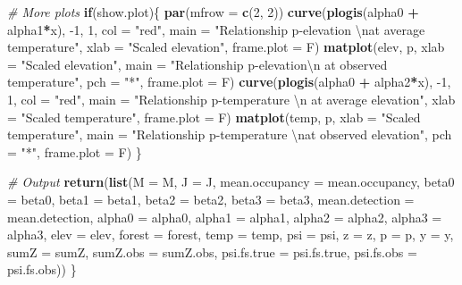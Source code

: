\documentclass[
]{book}
\newenvironment{Shaded}{\begin{snugshade}}{\end{snugshade}}
\newcommand{\CharTok}[1]{\textcolor[rgb]{0.31,0.60,0.02}{#1}}
\newcommand{\CommentTok}[1]{\textcolor[rgb]{0.56,0.35,0.01}{\textit{#1}}}
\newcommand{\ControlFlowTok}[1]{\textcolor[rgb]{0.13,0.29,0.53}{\textbf{#1}}}
\newcommand{\DataTypeTok}[1]{\textcolor[rgb]{0.13,0.29,0.53}{#1}}
\newcommand{\DecValTok}[1]{\textcolor[rgb]{0.00,0.00,0.81}{#1}}
\newcommand{\KeywordTok}[1]{\textcolor[rgb]{0.13,0.29,0.53}{\textbf{#1}}}
\newcommand{\NormalTok}[1]{#1}
\newcommand{\OperatorTok}[1]{\textcolor[rgb]{0.81,0.36,0.00}{\textbf{#1}}}
\newcommand{\StringTok}[1]{\textcolor[rgb]{0.31,0.60,0.02}{#1}}
\begin{document}
\begin{Shaded}
\begin{Highlighting}[]
\CommentTok{# More plots}
\ControlFlowTok{if}\NormalTok{(show.plot)\{}
  \KeywordTok{par}\NormalTok{(}\DataTypeTok{mfrow =} \KeywordTok{c}\NormalTok{(}\DecValTok{2}\NormalTok{, }\DecValTok{2}\NormalTok{))}
  \KeywordTok{curve}\NormalTok{(}\KeywordTok{plogis}\NormalTok{(alpha0 }\OperatorTok{+}\StringTok{ }\NormalTok{alpha1}\OperatorTok{*}\NormalTok{x), }\DecValTok{-1}\NormalTok{, }\DecValTok{1}\NormalTok{, }\DataTypeTok{col =} \StringTok{"red"}\NormalTok{, }
      \DataTypeTok{main =} \StringTok{"Relationship p-elevation }\CharTok{\textbackslash{}n}\StringTok{at average temperature"}\NormalTok{, }
      \DataTypeTok{xlab =} \StringTok{"Scaled elevation"}\NormalTok{, }\DataTypeTok{frame.plot =}\NormalTok{ F)}
  \KeywordTok{matplot}\NormalTok{(elev, p, }\DataTypeTok{xlab =} \StringTok{"Scaled elevation"}\NormalTok{, }
        \DataTypeTok{main =} \StringTok{"Relationship p-elevation}\CharTok{\textbackslash{}n}\StringTok{ at observed temperature"}\NormalTok{, }
        \DataTypeTok{pch =} \StringTok{"*"}\NormalTok{, }\DataTypeTok{frame.plot =}\NormalTok{ F)}
  \KeywordTok{curve}\NormalTok{(}\KeywordTok{plogis}\NormalTok{(alpha0 }\OperatorTok{+}\StringTok{ }\NormalTok{alpha2}\OperatorTok{*}\NormalTok{x), }\DecValTok{-1}\NormalTok{, }\DecValTok{1}\NormalTok{, }\DataTypeTok{col =} \StringTok{"red"}\NormalTok{, }
      \DataTypeTok{main =} \StringTok{"Relationship p-temperature }\CharTok{\textbackslash{}n}\StringTok{ at average elevation"}\NormalTok{, }
      \DataTypeTok{xlab =} \StringTok{"Scaled temperature"}\NormalTok{, }\DataTypeTok{frame.plot =}\NormalTok{ F)}
  \KeywordTok{matplot}\NormalTok{(temp, p, }\DataTypeTok{xlab =} \StringTok{"Scaled temperature"}\NormalTok{, }
        \DataTypeTok{main =} \StringTok{"Relationship p-temperature }\CharTok{\textbackslash{}n}\StringTok{at observed elevation"}\NormalTok{, }
        \DataTypeTok{pch =} \StringTok{"*"}\NormalTok{, }\DataTypeTok{frame.plot =}\NormalTok{ F)}
\NormalTok{\}}

\CommentTok{# Output}
\KeywordTok{return}\NormalTok{(}\KeywordTok{list}\NormalTok{(}\DataTypeTok{M =}\NormalTok{ M, }\DataTypeTok{J =}\NormalTok{ J, }\DataTypeTok{mean.occupancy =}\NormalTok{ mean.occupancy, }
            \DataTypeTok{beta0 =}\NormalTok{ beta0, }\DataTypeTok{beta1 =}\NormalTok{ beta1, }\DataTypeTok{beta2 =}\NormalTok{ beta2, }\DataTypeTok{beta3 =}\NormalTok{ beta3, }
            \DataTypeTok{mean.detection =}\NormalTok{ mean.detection, }
            \DataTypeTok{alpha0 =}\NormalTok{ alpha0, }\DataTypeTok{alpha1 =}\NormalTok{ alpha1, }\DataTypeTok{alpha2 =}\NormalTok{ alpha2, }\DataTypeTok{alpha3 =}\NormalTok{ alpha3, }
            \DataTypeTok{elev =}\NormalTok{ elev, }\DataTypeTok{forest =}\NormalTok{ forest, }\DataTypeTok{temp =}\NormalTok{ temp, }
            \DataTypeTok{psi =}\NormalTok{ psi, }\DataTypeTok{z =}\NormalTok{ z, }\DataTypeTok{p =}\NormalTok{ p, }\DataTypeTok{y =}\NormalTok{ y, }\DataTypeTok{sumZ =}\NormalTok{ sumZ, }\DataTypeTok{sumZ.obs =}\NormalTok{ sumZ.obs, }
            \DataTypeTok{psi.fs.true =}\NormalTok{ psi.fs.true, }\DataTypeTok{psi.fs.obs =}\NormalTok{ psi.fs.obs))}
\NormalTok{\}}


\end{Highlighting}
\end{Shaded}
\end{document}

